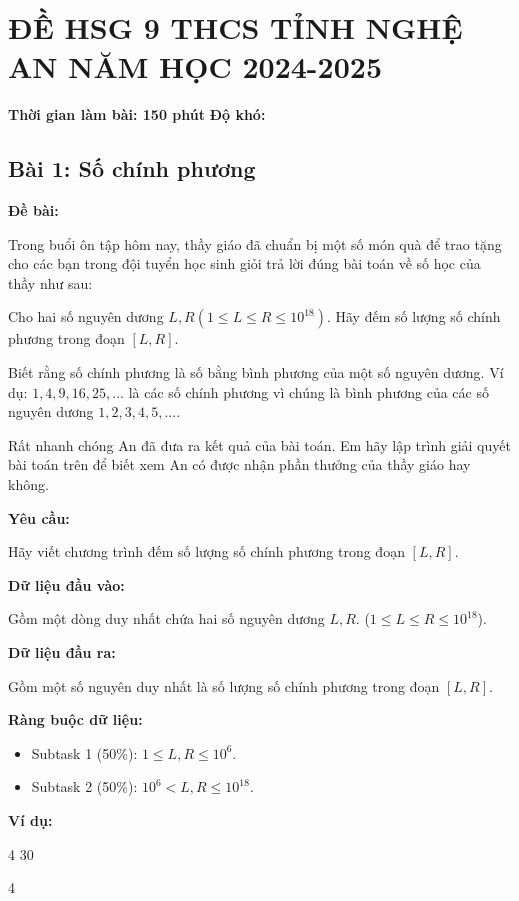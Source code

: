 \documentclass[12pt]{scrartcl}  %
\begin{document}
\section{ĐỀ HSG 9 THCS TỈNH NGHỆ AN NĂM HỌC 2024-2025}
\textbf{Thời gian làm bài: 150 phút}
\textbf{Độ khó: }
\subsection{Bài 1: Số chính phương}

\textbf{Đề bài:}

Trong buổi ôn tập hôm nay, thầy giáo đã chuẩn bị một số món quà để trao tặng cho các bạn trong đội tuyển học sinh giỏi trả lời đúng bài toán về số học của thầy như sau: 

Cho hai số nguyên dương $L, R (1 \leq L \leq R \leq 10^{18})$. Hãy đếm số lượng số chính phương trong đoạn $[L, R]$.

Biết rằng số chính phương là số bằng bình phương của một số nguyên dương. Ví dụ: $1, 4, 9, 16, 25, ...$ là các số chính phương vì chúng là bình phương của các số nguyên dương $1, 2, 3, 4, 5, ...$.

Rất nhanh chóng An đã đưa ra kết quả của bài toán. Em hãy lập trình giải quyết bài toán trên để biết xem An có được nhận phần thưởng của thầy giáo hay không.

\textbf{Yêu cầu:}

Hãy viết chương trình đếm số lượng số chính phương trong đoạn $[L, R]$.

\textbf{Dữ liệu đầu vào:}

Gồm một dòng duy nhất chứa hai số nguyên dương $L, R$. ($1 \leq L \leq R \leq 10^{18}$).

\textbf{Dữ liệu đầu ra:}

Gồm một số nguyên duy nhất là số lượng số chính phương trong đoạn $[L, R]$.

\textbf{Ràng buộc dữ liệu:}

\begin{itemize}
    \item Subtask 1 (50\%): $1 \leq L, R \leq 10^6$.
    \item Subtask 2 (50\%): $10^6 < L, R \leq 10^{18}$.
\end{itemize}

\textbf{Ví dụ:}
\begin{tcolorbox}[colback=gray!5!white, colframe=blue!50!black, title=Input]
4 30
\end{tcolorbox}
\begin{tcolorbox}[colback=gray!5!white, colframe=green!50!black, title=Output]
4
\end{tcolorbox}
\end{document}
